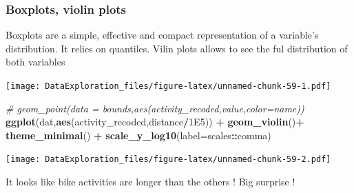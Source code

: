 \documentclass[
]{book}
\newenvironment{Shaded}{\begin{snugshade}}{\end{snugshade}}
\newcommand{\CommentTok}[1]{\textcolor[rgb]{0.56,0.35,0.01}{\textit{#1}}}
\newcommand{\DataTypeTok}[1]{\textcolor[rgb]{0.13,0.29,0.53}{#1}}
\newcommand{\FloatTok}[1]{\textcolor[rgb]{0.00,0.00,0.81}{#1}}
\newcommand{\KeywordTok}[1]{\textcolor[rgb]{0.13,0.29,0.53}{\textbf{#1}}}
\newcommand{\NormalTok}[1]{#1}
\newcommand{\OperatorTok}[1]{\textcolor[rgb]{0.81,0.36,0.00}{\textbf{#1}}}
\newcommand{\StringTok}[1]{\textcolor[rgb]{0.31,0.60,0.02}{#1}}
\begin{document}
\hypertarget{boxplots-violin-plots}{%
\subsubsection{Boxplots, violin plots}\label{boxplots-violin-plots}}

Boxplots are a simple, effective and compact representation of a variable's distribution. It relies on quantiles.
Vilin plots allows to see the ful distribution of both variables

\begin{Shaded}
\end{Shaded}

\texttt{[image: DataExploration\_files/figure-latex/unnamed-chunk-59-1.pdf]}

\begin{Shaded}
\begin{Highlighting}[]
  \CommentTok{# geom_point(data = bounds,aes(activity_recoded,value,color=name))}
\KeywordTok{ggplot}\NormalTok{(dat,}\KeywordTok{aes}\NormalTok{(activity_recoded,distance}\OperatorTok{/}\FloatTok{1E5}\NormalTok{)) }\OperatorTok{+}\StringTok{ }\KeywordTok{geom_violin}\NormalTok{()}\OperatorTok{+}\StringTok{ }\KeywordTok{theme_minimal}\NormalTok{() }\OperatorTok{+}\StringTok{ }\KeywordTok{scale_y_log10}\NormalTok{(}\DataTypeTok{label=}\NormalTok{scales}\OperatorTok{::}\NormalTok{comma)}
\end{Highlighting}
\end{Shaded}

\texttt{[image: DataExploration\_files/figure-latex/unnamed-chunk-59-2.pdf]}

It looks like bike activities are longer than the others ! Big surprise !
\end{document}
